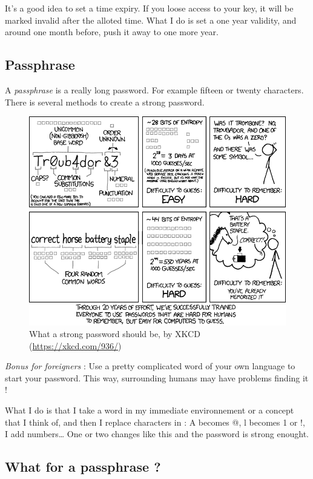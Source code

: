 It's a good idea to set a time expiry. If you loose access to your key, it will be marked invalid after the
alloted time. What I do is set a one year validity, and around one month before, push
it away to one more year.

\subsection{Passphrase}\label{passphrase}

A \emph{passphrase} is a really long password. For example fifteen or
twenty characters. There is several methods to create a strong password.

\begin{figure}[h]
\includegraphics[width=\linewidth]{./images/password_strength.png}
\caption{What a strong password should be, by XKCD (\url{https://xkcd.com/936/})}
\end{figure}

\emph{Bonus for foreigners} : Use a pretty complicated word of your own
language to start your password. This way, surrounding humans may have
problems finding it !

What I do is that I take a word in my immediate environnement or a
concept that I think of, and then I replace characters in : A becomes @,
l becomes 1 or !, I add numbers\ldots{} One or two changes like this and
the password is strong enought.

\subsection{What for a passphrase ?}\label{what-for-a-passphrase}

